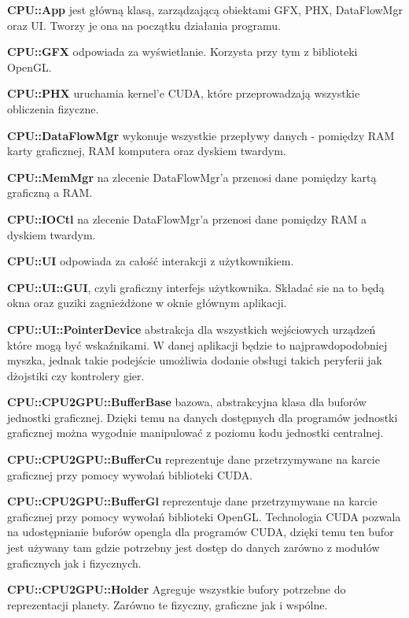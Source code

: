 \begin{description}
\item{\bf CPU::App} jest główną klasą, zarządzającą obiektami GFX, PHX, DataFlowMgr oraz UI. Tworzy je ona na początku działania programu.
\item{\bf CPU::GFX} odpowiada za wyświetlanie. Korzysta przy tym z biblioteki OpenGL.
\item{\bf CPU::PHX} uruchamia kernel'e CUDA, które przeprowadzają wszystkie obliczenia fizyczne.
\item{\bf CPU::DataFlowMgr} wykonuje wszystkie przepływy danych - pomiędzy RAM karty graficznej, RAM komputera oraz dyskiem twardym.
\item{\bf CPU::MemMgr} na zlecenie DataFlowMgr'a przenosi dane pomiędzy kartą graficzną a RAM.
\item{\bf CPU::IOCtl} na zlecenie DataFlowMgr'a przenosi dane pomiędzy RAM a dyskiem twardym.
\item{\bf CPU::UI} odpowiada za całość interakcji z użytkownikiem.

\item{\bf CPU::UI::GUI}, czyli graficzny interfejs użytkownika. Składać sie na to będą okna oraz guziki zagnieżdżone w oknie głównym aplikacji.
\item{\bf CPU::UI::PointerDevice} abstrakcja dla wszystkich wejściowych urządzeń które mogą być wskaźnikami. W danej aplikacji będzie to najprawdopodobniej myszka, jednak takie podejście umożliwia dodanie obsługi takich peryferii jak dżojstiki czy kontrolery gier.
\item{\bf CPU::CPU2GPU::BufferBase} bazowa, abstrakcyjna klasa dla buforów jednostki graficznej. Dzięki temu na danych dostępnych dla programów jednostki graficznej można wygodnie manipulować z poziomu kodu jednostki centralnej.
\item{\bf CPU::CPU2GPU::BufferCu} reprezentuje dane przetrzymywane na karcie graficznej przy pomocy wywołań biblioteki CUDA.
\item{\bf CPU::CPU2GPU::BufferGl} reprezentuje dane przetrzymywane na karcie graficznej przy pomocy wywołań biblioteki OpenGL. Technologia CUDA pozwala na udostępnianie buforów opengla dla programów CUDA, dzięki temu ten bufor jest używany tam gdzie potrzebny jest dostęp do danych zarówno z modułów graficznych jak i fizycznych.
\item{\bf CPU::CPU2GPU::Holder} Agreguje wszystkie bufory potrzebne do reprezentacji planety. Zarówno te fizyczny, graficzne jak i wspólne.
\end{description}

